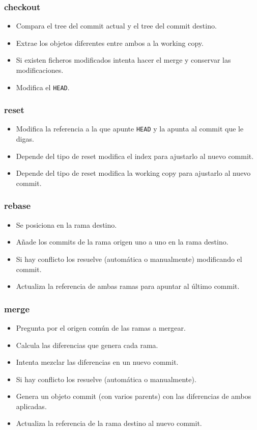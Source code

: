 \documentclass[10pt]{beamer}
\begin{document}
  \begin{frame}[containsverbatim]
    \frametitle{checkout}
    \begin{itemize}
      \item Compara el tree del commit actual y el tree del commit destino.
      \item Extrae los objetos diferentes entre ambos a la working copy.
      \item Si existen ficheros modificados intenta hacer el merge y conservar las modificaciones.
      \item Modifica el \verb+HEAD+.
    \end{itemize}
  \end{frame}

  \begin{frame}[containsverbatim]
    \frametitle{reset}
    \begin{itemize}
      \item Modifica la referencia a la que apunte \verb+HEAD+ y la apunta al commit que le digas.
      \item Depende del tipo de reset modifica el index para ajustarlo al nuevo commit.
      \item Depende del tipo de reset modifica la working copy para ajustarlo al nuevo commit.
    \end{itemize}
  \end{frame}

  \begin{frame}[containsverbatim]
    \frametitle{rebase}
    \begin{itemize}
      \item Se posiciona en la rama destino.
      \item Añade los commits de la rama origen uno a uno en la rama destino.
      \item Si hay conflicto los resuelve (automática o manualmente) modificando el commit.
      \item Actualiza la referencia de ambas ramas para apuntar al último commit.
    \end{itemize}
  \end{frame}

  \begin{frame}[containsverbatim]
    \frametitle{merge}
    \begin{itemize}
      \item Pregunta por el origen común de las ramas a mergear.
      \item Calcula las diferencias que genera cada rama.
      \item Intenta mezclar las diferencias en un nuevo commit.
      \item Si hay conflicto los resuelve (automática o manualmente).
      \item Genera un objeto commit (con varios parents) con las diferencias de ambos aplicadas.
      \item Actualiza la referencia de la rama destino al nuevo commit.
    \end{itemize}
  \end{frame}
\end{document}
